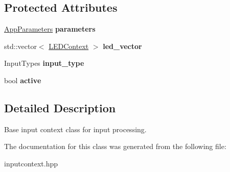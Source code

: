 \subsection*{Protected Attributes}
\begin{DoxyCompactItemize}
\item 
\mbox{\label{classBaseInputContext_a5fdbf0449f1db374d967fd5fe9f6d429}} 
\hyperlink{structAppParameters}{App\+Parameters} {\bfseries parameters}
\item 
\mbox{\label{classBaseInputContext_afbc4885e5ffea25ca766188ba74365dc}} 
std\+::vector$<$ \hyperlink{classLEDContext}{L\+E\+D\+Context} $>$ {\bfseries led\+\_\+vector}
\item 
\mbox{\label{classBaseInputContext_ad8596def18b875e990a9097ecbc1f60f}} 
Input\+Types {\bfseries input\+\_\+type}
\item 
\mbox{\label{classBaseInputContext_afc497040a6a6b44f3d753df6f0d70721}} 
bool {\bfseries active}
\end{DoxyCompactItemize}


\subsection{Detailed Description}
Base input context class for input processing. 

The documentation for this class was generated from the following file\+:\begin{DoxyCompactItemize}
\item 
inputcontext.\+hpp\end{DoxyCompactItemize}
